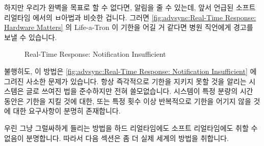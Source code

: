 하지만 우리가 완벽을 목표로 할 수 없다면, 알림을 줄 수 있는데, 앞서 언급된
소프트 리얼타임 에서의 ㅂ아법과 비슷한 겁니다.
그러면
\cref{fig:advsync:Real-Time Response: Hardware Matters}
의 Life-a-Tron 이 기한을 어길 거 같다면 병원 직언에게 경고를 보낼 수 있습니다.

\begin{figure}[bt]
\centering
{}
\caption{Real-Time Response: Notification Insufficient}
\end{figure}

불행히도, 이 방법은
\cref{fig:advsync:Real-Time Response: Notification Insufficient}
에 그려진 사소한 문제가 있습니다.
항상 즉각적으로 기한을 지키지 못할 것을 알리는 시스템은 글로 쓰여진 법을
준수하지만 전혀 쓸모없습니다.
시스템이 특정 분량의 시간 동안은 기한을 지킬 것에 대한, 또는 특정 횟수 이상
반복적으로 기한을 어기지 않을 것에 대한 요구사항이 분명히 존재합니다.

우린 그냥 그럴싸하게 들리는 방법을 하드 리얼타임에도 소프트 리얼타임에도 취할
수 없음이 분명합니다.
따라서 다음 섹션은 좀 더 실제 세계의 방법을 취합니다.

\iffalse

